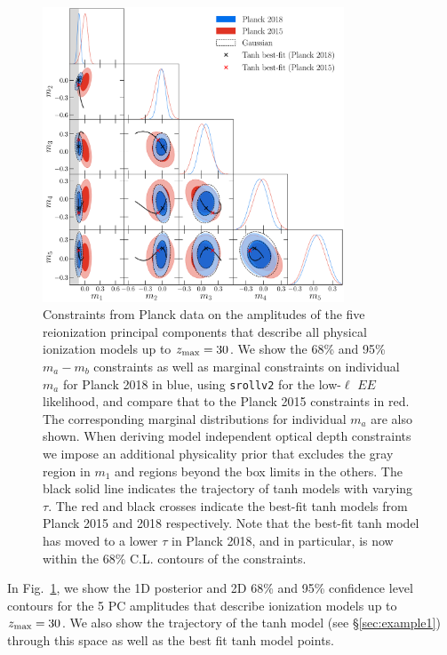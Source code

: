 \documentclass[prd,twocolumn,amsmath,amssymb,floatfix,superscriptaddress,nofootinbib]{revtex4-1}
\newcommand{\zmax}{z_{\rm max}}
\begin{document}
\begin{figure}
\includegraphics[width=0.8\textwidth]{paper/plots/plot_mj_triangle_t18_r12_t19_t20_vs_pl18_pc_zmax30_pliklite_srollv2_1015_wTauTrajectory_pl15_wTanhML_wGaussEllipse.pdf}
\caption{Constraints from Planck data on the amplitudes of the five reionization principal components that describe all physical ionization models up to $z_{\rm max} = 30$. We show  the 68\% and 95\% $m_a-m_b$ constraints as well as marginal constraints on individual $m_a$ for Planck 2018 in blue,
using \texttt{srollv2} for the low-$\ell$ $EE$ likelihood, and compare that to the Planck 2015 constraints in red.  The corresponding marginal distributions for individual $m_a$ are also shown.
When deriving model independent optical depth constraints we impose an additional physicality prior that excludes the gray region in $m_1$ and regions beyond the box limits in the others.
 The black solid line indicates the trajectory of tanh models with varying $\tau$. The red and black crosses indicate the best-fit tanh models from Planck 2015 and 2018 respectively. Note that the best-fit tanh model has moved to a lower $\tau$ in Planck 2018, and in particular, is now within the 68\% C.L. contours of the constraints.
}
\label{fig:plot_mjs_2018_vs_2015}
\end{figure}
%
%
%
%
In Fig.~\ref{fig:plot_mjs_2018_vs_2015}, we show the 1D posterior and 2D 68\% and 95\% confidence level contours for the 5 PC amplitudes that describe ionization models up to $\zmax=30$. We also show the trajectory of the tanh model (see \S \ref{sec:example1}) through this space as well as the best fit tanh model points.
\end{document}
